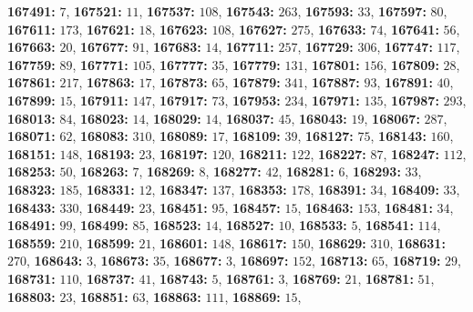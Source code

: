 \textsf{\bfseries 167491:} $7$, \textsf{\bfseries 167521:} $11$, \textsf{\bfseries 167537:} $108$, \textsf{\bfseries 167543:} $263$, \textsf{\bfseries 167593:} $33$, \textsf{\bfseries 167597:} $80$, \textsf{\bfseries 167611:} $173$, \textsf{\bfseries 167621:} $18$, \textsf{\bfseries 167623:} $108$, \textsf{\bfseries 167627:} $275$, \textsf{\bfseries 167633:} $74$, \textsf{\bfseries 167641:} $56$, \textsf{\bfseries 167663:} $20$, \textsf{\bfseries 167677:} $91$, \textsf{\bfseries 167683:} $14$, \textsf{\bfseries 167711:} $257$, \textsf{\bfseries 167729:} $306$, \textsf{\bfseries 167747:} $117$, \textsf{\bfseries 167759:} $89$, \textsf{\bfseries 167771:} $105$, \textsf{\bfseries 167777:} $35$, \textsf{\bfseries 167779:} $131$, \textsf{\bfseries 167801:} $156$, \textsf{\bfseries 167809:} $28$, \textsf{\bfseries 167861:} $217$, \textsf{\bfseries 167863:} $17$, \textsf{\bfseries 167873:} $65$, \textsf{\bfseries 167879:} $341$, \textsf{\bfseries 167887:} $93$, \textsf{\bfseries 167891:} $40$, \textsf{\bfseries 167899:} $15$, \textsf{\bfseries 167911:} $147$, \textsf{\bfseries 167917:} $73$, \textsf{\bfseries 167953:} $234$, \textsf{\bfseries 167971:} $135$, \textsf{\bfseries 167987:} $293$, \textsf{\bfseries 168013:} $84$, \textsf{\bfseries 168023:} $14$, \textsf{\bfseries 168029:} $14$, \textsf{\bfseries 168037:} $45$, \textsf{\bfseries 168043:} $19$, \textsf{\bfseries 168067:} $287$, \textsf{\bfseries 168071:} $62$, \textsf{\bfseries 168083:} $310$, \textsf{\bfseries 168089:} $17$, \textsf{\bfseries 168109:} $39$, \textsf{\bfseries 168127:} $75$, \textsf{\bfseries 168143:} $160$, \textsf{\bfseries 168151:} $148$, \textsf{\bfseries 168193:} $23$, \textsf{\bfseries 168197:} $120$, \textsf{\bfseries 168211:} $122$, \textsf{\bfseries 168227:} $87$, \textsf{\bfseries 168247:} $112$, \textsf{\bfseries 168253:} $50$, \textsf{\bfseries 168263:} $7$, \textsf{\bfseries 168269:} $8$, \textsf{\bfseries 168277:} $42$, \textsf{\bfseries 168281:} $6$, \textsf{\bfseries 168293:} $33$, \textsf{\bfseries 168323:} $185$, \textsf{\bfseries 168331:} $12$, \textsf{\bfseries 168347:} $137$, \textsf{\bfseries 168353:} $178$, \textsf{\bfseries 168391:} $34$, \textsf{\bfseries 168409:} $33$, \textsf{\bfseries 168433:} $330$, \textsf{\bfseries 168449:} $23$, \textsf{\bfseries 168451:} $95$, \textsf{\bfseries 168457:} $15$, \textsf{\bfseries 168463:} $153$, \textsf{\bfseries 168481:} $34$, \textsf{\bfseries 168491:} $99$, \textsf{\bfseries 168499:} $85$, \textsf{\bfseries 168523:} $14$, \textsf{\bfseries 168527:} $10$, \textsf{\bfseries 168533:} $5$, \textsf{\bfseries 168541:} $114$, \textsf{\bfseries 168559:} $210$, \textsf{\bfseries 168599:} $21$, \textsf{\bfseries 168601:} $148$, \textsf{\bfseries 168617:} $150$, \textsf{\bfseries 168629:} $310$, \textsf{\bfseries 168631:} $270$, \textsf{\bfseries 168643:} $3$, \textsf{\bfseries 168673:} $35$, \textsf{\bfseries 168677:} $3$, \textsf{\bfseries 168697:} $152$, \textsf{\bfseries 168713:} $65$, \textsf{\bfseries 168719:} $29$, \textsf{\bfseries 168731:} $110$, \textsf{\bfseries 168737:} $41$, \textsf{\bfseries 168743:} $5$, \textsf{\bfseries 168761:} $3$, \textsf{\bfseries 168769:} $21$, \textsf{\bfseries 168781:} $51$, \textsf{\bfseries 168803:} $23$, \textsf{\bfseries 168851:} $63$, \textsf{\bfseries 168863:} $111$, \textsf{\bfseries 168869:} $15$, 
